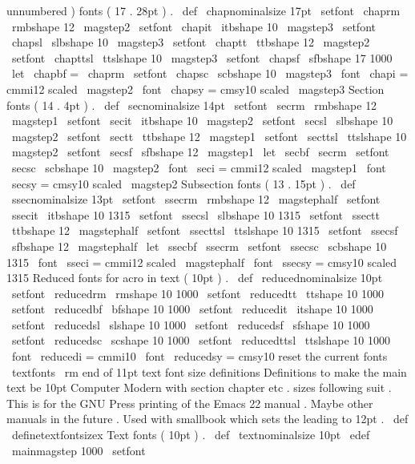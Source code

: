 {{unnumbered
)
fonts
(
17
.
28pt
)
.
\
def
\
chapnominalsize
{
17pt
}
\
setfont
\
chaprm
\
rmbshape
{
12
}
{
\
magstep2
}
\
setfont
\
chapit
\
itbshape
{
10
}
{
\
magstep3
}
\
setfont
\
chapsl
\
slbshape
{
10
}
{
\
magstep3
}
\
setfont
\
chaptt
\
ttbshape
{
12
}
{
\
magstep2
}
\
setfont
\
chapttsl
\
ttslshape
{
10
}
{
\
magstep3
}
\
setfont
\
chapsf
\
sfbshape
{
17
}
{
1000
}
\
let
\
chapbf
=
\
chaprm
\
setfont
\
chapsc
\
scbshape
{
10
}
{
\
magstep3
}
\
font
\
chapi
=
cmmi12
scaled
\
magstep2
\
font
\
chapsy
=
cmsy10
scaled
\
magstep3
%
Section
fonts
(
14
.
4pt
)
.
\
def
\
secnominalsize
{
14pt
}
\
setfont
\
secrm
\
rmbshape
{
12
}
{
\
magstep1
}
\
setfont
\
secit
\
itbshape
{
10
}
{
\
magstep2
}
\
setfont
\
secsl
\
slbshape
{
10
}
{
\
magstep2
}
\
setfont
\
sectt
\
ttbshape
{
12
}
{
\
magstep1
}
\
setfont
\
secttsl
\
ttslshape
{
10
}
{
\
magstep2
}
\
setfont
\
secsf
\
sfbshape
{
12
}
{
\
magstep1
}
\
let
\
secbf
\
secrm
\
setfont
\
secsc
\
scbshape
{
10
}
{
\
magstep2
}
\
font
\
seci
=
cmmi12
scaled
\
magstep1
\
font
\
secsy
=
cmsy10
scaled
\
magstep2
%
Subsection
fonts
(
13
.
15pt
)
.
\
def
\
ssecnominalsize
{
13pt
}
\
setfont
\
ssecrm
\
rmbshape
{
12
}
{
\
magstephalf
}
\
setfont
\
ssecit
\
itbshape
{
10
}
{
1315
}
\
setfont
\
ssecsl
\
slbshape
{
10
}
{
1315
}
\
setfont
\
ssectt
\
ttbshape
{
12
}
{
\
magstephalf
}
\
setfont
\
ssecttsl
\
ttslshape
{
10
}
{
1315
}
\
setfont
\
ssecsf
\
sfbshape
{
12
}
{
\
magstephalf
}
\
let
\
ssecbf
\
ssecrm
\
setfont
\
ssecsc
\
scbshape
{
10
}
{
1315
}
\
font
\
sseci
=
cmmi12
scaled
\
magstephalf
\
font
\
ssecsy
=
cmsy10
scaled
1315
%
Reduced
fonts
for
acro
in
text
(
10pt
)
.
\
def
\
reducednominalsize
{
10pt
}
\
setfont
\
reducedrm
\
rmshape
{
10
}
{
1000
}
\
setfont
\
reducedtt
\
ttshape
{
10
}
{
1000
}
\
setfont
\
reducedbf
\
bfshape
{
10
}
{
1000
}
\
setfont
\
reducedit
\
itshape
{
10
}
{
1000
}
\
setfont
\
reducedsl
\
slshape
{
10
}
{
1000
}
\
setfont
\
reducedsf
\
sfshape
{
10
}
{
1000
}
\
setfont
\
reducedsc
\
scshape
{
10
}
{
1000
}
\
setfont
\
reducedttsl
\
ttslshape
{
10
}
{
1000
}
\
font
\
reducedi
=
cmmi10
\
font
\
reducedsy
=
cmsy10
%
reset
the
current
fonts
\
textfonts
\
rm
}
%
end
of
11pt
text
font
size
definitions
%
Definitions
to
make
the
main
text
be
10pt
Computer
Modern
with
%
section
chapter
etc
.
sizes
following
suit
.
This
is
for
the
GNU
%
Press
printing
of
the
Emacs
22
manual
.
Maybe
other
manuals
in
the
%
future
.
Used
with
smallbook
which
sets
the
leading
to
12pt
.
%
\
def
\
definetextfontsizex
{
%
%
Text
fonts
(
10pt
)
.
\
def
\
textnominalsize
{
10pt
}
\
edef
\
mainmagstep
{
1000
}
\
setfont
\
}}
